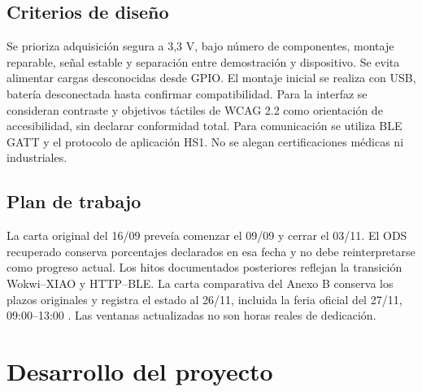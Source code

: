 \documentclass[11pt,letterpaper]{article}
\begin{document}
\subsection{Criterios de diseño}
Se prioriza adquisición segura a 3,3 V, bajo número de componentes, montaje reparable, señal estable y separación entre demostración y dispositivo. Se evita alimentar cargas desconocidas desde GPIO. El montaje inicial se realiza con USB, batería desconectada hasta confirmar compatibilidad. Para la interfaz se consideran contraste y objetivos táctiles de WCAG 2.2 \cite{wcag} como orientación de accesibilidad, sin declarar conformidad total. Para comunicación se utiliza BLE GATT y el protocolo de aplicación HS1. No se alegan certificaciones médicas ni industriales.
\subsection{Plan de trabajo}
La carta original del 16/09 preveía comenzar el 09/09 y cerrar el 03/11. El ODS recuperado conserva porcentajes declarados en esa fecha y no debe reinterpretarse como progreso actual. Los hitos documentados posteriores reflejan la transición Wokwi--XIAO y HTTP--BLE. La carta comparativa del Anexo B conserva los plazos originales y registra el estado al 26/11, incluida la feria oficial del 27/11, 09:00--13:00 \cite{rubrica}. Las ventanas actualizadas no son horas reales de dedicación.
\section{Desarrollo del proyecto}
\end{document}
